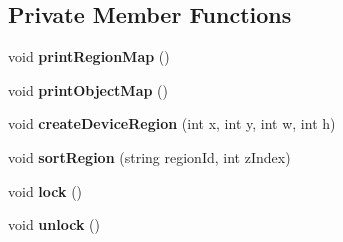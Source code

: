 \subsection*{Private Member Functions}
\begin{CompactItemize}
\item 
void \textbf{printRegionMap} ()\label{classbr_1_1pucrio_1_1telemidia_1_1ginga_1_1ncl_1_1model_1_1presentation_1_1FormatterLayout_11189fcd6c214000cbf3c2e0f7ce7ecf}

\item 
void \textbf{printObjectMap} ()\label{classbr_1_1pucrio_1_1telemidia_1_1ginga_1_1ncl_1_1model_1_1presentation_1_1FormatterLayout_f369cc94f2ed4f19d1220769ac14510e}

\item 
void \textbf{createDeviceRegion} (int x, int y, int w, int h)\label{classbr_1_1pucrio_1_1telemidia_1_1ginga_1_1ncl_1_1model_1_1presentation_1_1FormatterLayout_6259e0237dee61a8e0ff76397e056f73}

\item 
void \textbf{sortRegion} (string regionId, int zIndex)\label{classbr_1_1pucrio_1_1telemidia_1_1ginga_1_1ncl_1_1model_1_1presentation_1_1FormatterLayout_955edb4a342d595b1b3b6aafc95e38c6}

\item 
void \textbf{lock} ()\label{classbr_1_1pucrio_1_1telemidia_1_1ginga_1_1ncl_1_1model_1_1presentation_1_1FormatterLayout_a81aed607133209dade63a226818224d}

\item 
void \textbf{unlock} ()\label{classbr_1_1pucrio_1_1telemidia_1_1ginga_1_1ncl_1_1model_1_1presentation_1_1FormatterLayout_9278be8203e1c42e2619179882ae4403}

\end{CompactItemize}
